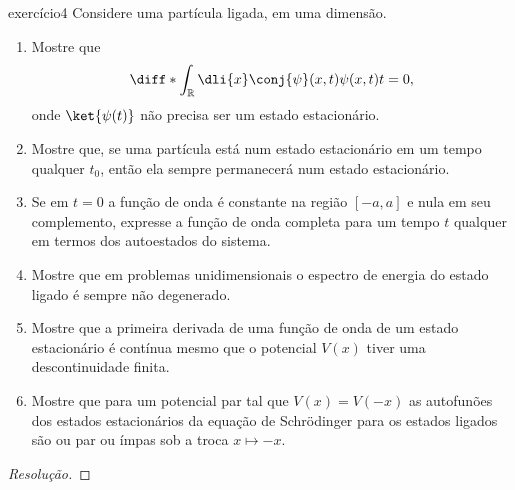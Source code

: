 \begin{exercício}{}{exercício4}
    Considere uma partícula ligada, em uma dimensão.
    \begin{enumerate}[label=(\alph*)]
        \item Mostre que
            \begin{equation*}
                \diff*{\int_{\mathbb{R}}\dli{x}\conj{\psi}(x,t)\psi(x,t)}{t} = 0,
            \end{equation*}
            onde \(\ket{\psi(t)}\) não precisa ser um estado estacionário.
        \item Mostre que, se uma partícula está num estado estacionário em um tempo qualquer \(t_0\), então ela sempre permanecerá num estado estacionário.
        \item Se em \(t = 0\) a função de onda é constante na região \([-a,a]\) e nula em seu complemento, expresse a função de onda completa para um tempo \(t\) qualquer em termos dos autoestados do sistema.
        \item Mostre que em problemas unidimensionais o espectro de energia do estado ligado é sempre não degenerado.
        \item Mostre que a primeira derivada de uma função de onda de um estado estacionário é contínua mesmo que o potencial \(V(x)\) tiver uma descontinuidade finita.
        \item Mostre que para um potencial par tal que \(V(x) = V(-x)\) as autofunões dos estados estacionários da equação de Schrödinger para os estados ligados são ou par ou ímpas sob a troca \(x \mapsto -x\).
    \end{enumerate}
\end{exercício}
\begin{proof}[Resolução]

\end{proof}
